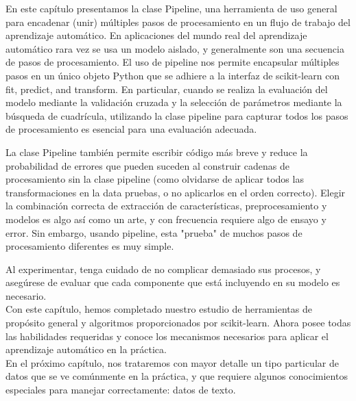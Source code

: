	En este capítulo presentamos la clase {\ttfamily  Pipeline}, una herramienta de uso general para encadenar
	(unir) múltiples pasos de procesamiento en un flujo de trabajo del aprendizaje automático. 
	En aplicaciones del mundo real  del aprendizaje automático rara vez se usa un modelo  aislado, y generalmente son una secuencia de pasos de procesamiento.   	El uso de {\ttfamily  pipeline} nos permite encapsular múltiples pasos
	en un único objeto Python que se adhiere a la interfaz de {\ttfamily scikit-learn} con {\ttfamily fit,
	predict}, and {\ttfamily transform}.    En particular, cuando se realiza la evaluación del modelo mediante la validación cruzada y la selección de parámetros mediante la búsqueda de cuadrícula, utilizando la clase {\ttfamily  pipeline}  para capturar todos los pasos de procesamiento  es esencial para una evaluación adecuada.
	

	
	La clase Pipeline también permite escribir código más breve  y reduce la probabilidad de
	errores que pueden suceden al construir cadenas de procesamiento sin la clase pipeline (como olvidarse de aplicar todos las transformaciones en la data pruebas, o no aplicarlos en el orden correcto).
	Elegir la combinación correcta de extracción de características, preprocesamiento y modelos es
	algo así como un arte, y con frecuencia requiere algo de ensayo y error.
	Sin embargo, usando pipeline, esta "prueba" de muchos pasos de procesamiento diferentes es muy simple. 
	
	Al experimentar, tenga cuidado de no complicar demasiado sus procesos, y asegúrese de evaluar que  cada componente que está incluyendo   en su modelo  es necesario. \\  

	Con este capítulo, hemos completado nuestro estudio de herramientas de propósito general y algoritmos proporcionados por {\ttfamily scikit-learn}. Ahora posee todas las habilidades requeridas y conoce los mecanismos necesarios para aplicar el aprendizaje automático en la práctica. \\
	
	En el próximo capítulo, nos trataremos  con mayor detalle  un tipo particular de datos que 
	se ve comúnmente en la práctica, y que requiere algunos conocimientos especiales para manejar correctamente: datos de texto.
	
	
	
	
	
